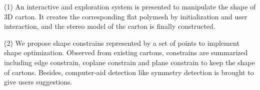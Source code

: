 (1) An interactive and exploration system is presented to manipulate the shape of 3D carton. It creates the corresponding flat polymesh by initialization and user interaction, and the stereo model of the carton is finally constructed.

(2) We propose shape constrains represented by a set of points to implement shape optimization. Observed from existing cartons,  constrains are summarized including edge constrain, coplane constrain and plane constrain to keep the shape of cartons. Besides, computer-aid detection like symmetry detection is brought to give users suggestions. 